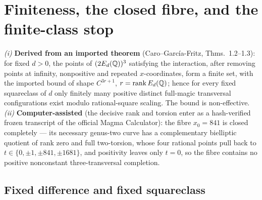 \section{Finiteness, the closed fibre, and the finite-class stop}\label{sec:finiteness}

\begin{theorem}\label{main:finiteness}
\emph{(i)} \textbf{Derived from an imported theorem} (Caro--Garc\'ia-Fritz,
Thms.~1.2--1.3): for fixed $d>0$, the points of $(2E_d(\mathbb{Q}))^{3}$ satisfying
the interaction, after removing points at infinity, nonpositive and
repeated $x$-coordinates, form a finite set, with the imported bound of shape
$C^{3r+1}$, $r=\operatorname{rank}E_d(\mathbb{Q})$; hence for every fixed
squareclass of $d$ only finitely many positive distinct full-magic transversal
configurations exist modulo rational-square scaling. The bound is
non-effective. \emph{(ii)} \textbf{Computer-assisted} (the decisive rank
and torsion enter as a hash-verified frozen transcript of the official
Magma Calculator): the fibre $x_0=841$ is closed completely --- its
necessary genus-two curve has a complementary bielliptic quotient of rank
zero and full two-torsion, whose four rational points pull back to
$t\in\{0,\pm1,\pm841,\pm1681\}$, and positivity leaves only $t=0$, so
the fibre contains no positive nonconstant three-transversal completion.
\end{theorem}

\subsection{Fixed difference and fixed squareclass}

